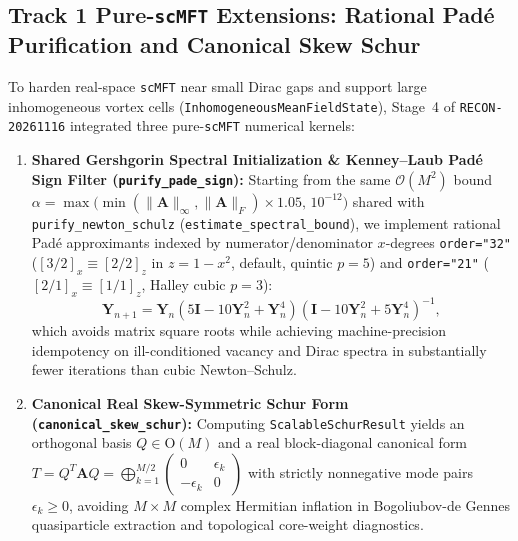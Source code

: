 \subsection{Track 1 Pure-\texttt{scMFT} Extensions: Rational Pad\'e Purification and Canonical Skew Schur}
To harden real-space \texttt{scMFT} near small Dirac gaps and support large inhomogeneous vortex cells (\texttt{InhomogeneousMeanFieldState}), Stage~4 of \texttt{RECON-20261116} integrated three pure-\texttt{scMFT} numerical kernels:
\begin{enumerate}
\item \textbf{Shared Gershgorin Spectral Initialization \& Kenney--Laub Pad\'e Sign Filter (\texttt{purify\_pade\_sign}):} Starting from the same $\mathcal{O}(M^2)$ bound $\alpha = \max\!\bigl(\min(\|\mathbf{A}\|_\infty, \|\mathbf{A}\|_F) \times 1.05,\, 10^{-12}\bigr)$ shared with \texttt{purify\_newton\_schulz} (\texttt{estimate\_spectral\_bound}), we implement rational Pad\'e approximants indexed by numerator/denominator $x$-degrees \texttt{order="32"} ($[3/2]_x \equiv [2/2]_z$ in $z = 1 - x^2$, default, quintic $p=5$) and \texttt{order="21"} ($[2/1]_x \equiv [1/1]_z$, Halley cubic $p=3$):
\begin{equation}
\mathbf{Y}_{n+1} = \mathbf{Y}_n \left( 5\mathbf{I} - 10\mathbf{Y}_n^2 + \mathbf{Y}_n^4 \right)\left( \mathbf{I} - 10\mathbf{Y}_n^2 + 5\mathbf{Y}_n^4 \right)^{-1},
\end{equation}
which avoids matrix square roots while achieving machine-precision idempotency on ill-conditioned vacancy and Dirac spectra in substantially fewer iterations than cubic Newton--Schulz.
\item \textbf{Canonical Real Skew-Symmetric Schur Form (\texttt{canonical\_skew\_schur}):} Computing \texttt{ScalableSchurResult} yields an orthogonal basis $Q \in \mathrm{O}(M)$ and a real block-diagonal canonical form $T = Q^T \mathbf{A} Q = \bigoplus_{k=1}^{M/2} \begin{pmatrix} 0 & \epsilon_k \\ -\epsilon_k & 0 \end{pmatrix}$ with strictly nonnegative mode pairs $\epsilon_k \ge 0$, avoiding $M \times M$ complex Hermitian inflation in Bogoliubov-de Gennes quasiparticle extraction and topological core-weight diagnostics.
\end{enumerate}

